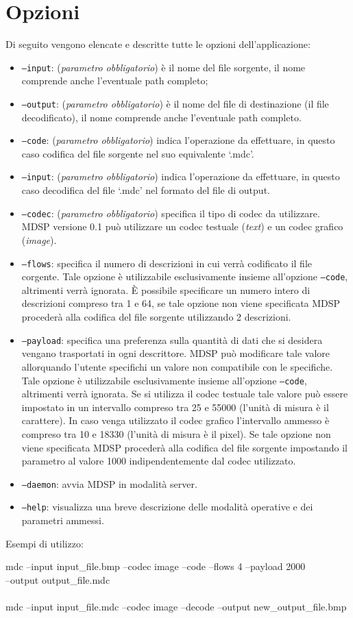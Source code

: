 \section{Opzioni}
\label{sec:opzioni}
Di seguito vengono elencate e descritte tutte le opzioni dell'applicazione:

\begin{itemize}
  \item \texttt{--input}: (\emph{parametro obbligatorio}) è il
  nome del file sorgente, il nome comprende anche l'eventuale path completo;
  \item \texttt{--output}: (\emph{parametro obbligatorio}) è il
  nome del file di destinazione (il file decodificato), il nome comprende anche l'eventuale path
  completo.
  \item \texttt{--code}: (\emph{parametro obbligatorio}) indica
  l'operazione da effettuare, in questo caso codifica del file sorgente nel suo equivalente
  `.mdc'.
  \item \texttt{--input}: (\emph{parametro obbligatorio}) indica
  l'operazione da effettuare, in questo caso decodifica del file `.mdc' nel
  formato del file di output.
  \item \texttt{--codec}: (\emph{parametro obbligatorio}) specifica il tipo di
  codec da utilizzare. MDSP versione 0.1 può utilizzare un codec testuale (\emph{text})
  e un codec grafico (\emph{image}).
  \item \texttt{--flows}: specifica il numero di descrizioni in cui verrà
  codificato il file corgente. Tale opzione è utilizzabile esclusivamente insieme all'opzione
  \texttt{--code}, altrimenti verrà ignorata. \`E possibile specificare un
  numero intero di descrizioni compreso tra 1 e 64, se tale opzione non viene
  specificata MDSP procederà alla codifica del file sorgente utilizzando 2
  descrizioni.
  \item \texttt{--payload}: specifica una preferenza sulla quantità di dati che
  si desidera vengano trasportati in ogni descrittore. MDSP può modificare tale
  valore allorquando l'utente specifichi un valore non compatibile con le
  specifiche. Tale opzione è utilizzabile esclusivamente insieme all'opzione
  \texttt{--code}, altrimenti verrà ignorata. Se si utilizza il codec testuale
  tale valore può essere impostato in un intervallo compreso tra 25 e 55000
  (l'unità di misura è il carattere). In caso venga utilizzato il codec grafico
  l'intervallo ammesso è compreso tra 10 e 18330 (l'unità di misura è il
  pixel). Se tale opzione non viene
  specificata MDSP procederà alla codifica del file sorgente impostando il
  parametro al valore 1000 indipendentemente dal codec utilizzato.
  \item \texttt{--daemon}: avvia MDSP in modalità server.
  \item \texttt{--help}: visualizza una breve descrizione delle modalità
  operative e dei parametri ammessi.
\end{itemize}

Esempi di utilizzo:

\begin{code}
mdc --input input\_file.bmp --codec image --code --flows 4 --payload
2000\\ --output output\_file.mdc\\\\
mdc --input input\_file.mdc --codec image --decode --output
new\_output\_file.bmp
\end{code}